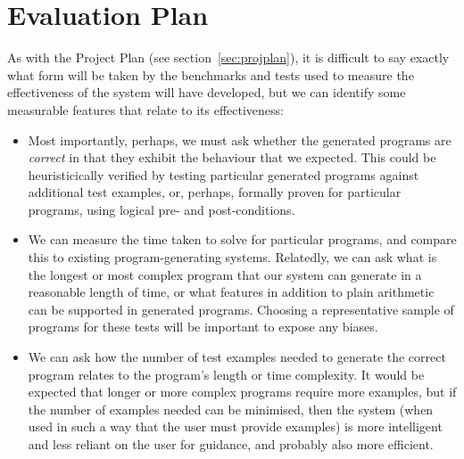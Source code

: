 \documentclass[a4paper,twoside,notitlepage]{article}
\begin{document}
\section{Evaluation Plan}

As with the Project Plan (see section~\ref{sec:projplan}), it is difficult to 
say exactly what form will be taken by the benchmarks and tests used to 
measure the effectiveness of the system will have developed, but we can 
identify some measurable features that relate to its effectiveness:

\begin{itemize}
    \item Most importantly, perhaps, we must ask whether the generated 
    programs are \emph{correct} in that they exhibit the behaviour that we 
    expected. This could be heuristicically verified by testing particular 
    generated programs against additional test examples, or, perhaps, formally 
    proven for particular programs, using logical pre- and post-conditions.

    \item We can measure the time taken to solve for particular programs, and 
    compare this to existing program-generating systems. Relatedly, we can ask 
    what is the longest or most complex program that our system can generate 
    in a reasonable length of time, or what features in addition to plain 
    arithmetic can be supported in generated programs. Choosing a 
    representative sample of programs for these tests will be important to 
    expose any biases.

    \item We can ask how the number of test examples needed to generate the 
    correct program relates to the program's length or time complexity. It 
    would be expected that longer or more complex programs require more 
    examples, but if the number of examples needed can be minimised, then the 
    system (when used in such a way that the user must provide examples) is 
    more intelligent and less reliant on the user for guidance, and probably 
    also more efficient.
\end{itemize}
\end{document}
